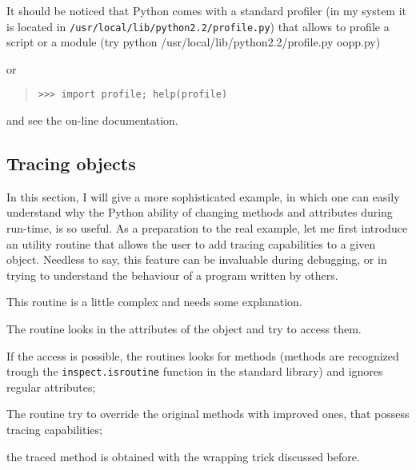 \documentclass[10pt,english]{article}
\begin{document}
It should be noticed that Python comes with a standard profiler
(in my system it is located in \texttt{/usr/local/lib/python2.2/profile.py})
that allows to profile a script or a module (try 
python /usr/local/lib/python2.2/profile.py oopp.py)

or
\begin{quote}
\begin{verbatim}>>> import profile; help(profile)\end{verbatim}
\end{quote}

and see the on-line documentation.



\hypertarget{tracing-objects}{}
\subsection*{Tracing objects}

In this section, I will give a more sophisticated example, in which 
one can easily understand why the Python ability of changing methods and 
attributes during run-time, is so useful.
As a preparation to the real example, let me
first introduce an utility routine that allows the user
to add tracing capabilities to a given object.
Needless to say, this feature can be invaluable during debugging, or in trying
to understand the behaviour of a program written by others.

This routine is a little complex and needs some explanation.
\begin{list}{.}
{
\setlength{\rightmargin}{\leftmargin}
}
\item {} 
The routine looks in the attributes of the object and try to access them.

\item {} 
If the access is possible, the routines looks for methods (methods
are recognized trough the \texttt{inspect.isroutine} function in the
standard library) and ignores regular attributes;

\item {} 
The routine try to override the original methods with improved ones,
that possess tracing capabilities;

\item {} 
the traced method is obtained with the wrapping trick discussed before.

\end{list}
\end{document}
